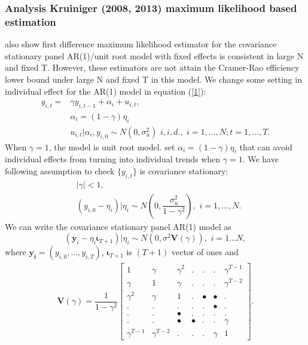 \documentclass[12pt,a4paper,hyperref]{article}
\begin{document}
\subsubsection{Analysis Kruiniger (2008, 2013) maximum likelihood based estimation }
\citet{Kruiniger:2008} also show first difference maximum likelihood estimator for the covariance stationary panel AR(1)/unit root model with fixed effects is consistent in large N and fixed T. However, these estimators are not attain the Cramer-Rao efficiency lower bound under large N and fixed T in this model. We change some setting in individual effect for the AR(1) model in equation (\ref{1}):
\begin{equation}
\begin{split}
y_{i,t}=&\gamma y_{i,t-1}+\alpha_{i}+u_{i,t}, \\
&\alpha_{i}=(1-\gamma)\eta_{i} \\
& u_{i,t} \vert \alpha_{i}, y_{i,0}\sim N(0,\sigma^{2}_{u}) \,\, i,i,d., \,\, i=1, \ldots, N; t=1,\ldots, T. \label{29}
\end{split}
\end{equation}
When $ \gamma=1 $, the model is unit root model. \citet{Kruiniger:2008} set $\alpha_{i}=(1-\gamma)\eta_{i}$ that can avoid individual effects from turning into individual trends when $\gamma=1$. 
We have following assumption to check $\lbrace y_{i,t}\rbrace$ is covariance stationary:
\begin{equation*}
\begin{split}
&\left\vert \gamma \right\vert < 1, \\
&\left( y_{i,0}-\eta_{i} \right)\vert \eta_{i}\sim N \left( 0,\dfrac{\sigma^{2}_{u}}{1-\gamma^{2}} \right), \,\, i=1, \ldots, N.
\end{split}
\end{equation*}
We can write the covariance stationary panel AR(1) model as
\begin{equation}
\left( \boldsymbol{y}_{i}-\eta_{i}\boldsymbol{\iota}_{T+1} \right)\vert \eta_{i} \sim N \left( 0, \sigma^{2}\boldsymbol{V}(\gamma) \right), \,\, i=1\ldots N,
\end{equation}
where $\boldsymbol{y_{i}}=\left( y_{i,0}, \ldots, y_{i,T} \right)$, $\boldsymbol{\iota}_{T+1}$ is $\left( T+1 \right)$ vector of ones and
\begin{align}
\boldsymbol{V} ( \gamma )=\dfrac{1}{1-\gamma^{2}}
\begin{bmatrix}
1 & \gamma & \gamma^{2} & . & . & . & \gamma^{T-1} \\
\gamma & 1 & \gamma & . & . & . & \gamma^{T-2} \\
\gamma^{2} & \gamma & 1 & . & • & • & . \\
. & . & . & . & . & • & . \\
. & . & • & . & . & . & . \\
. & . & • & • & . & . & \gamma \\
\gamma^{T-1} & \gamma^{T-2} & . & . & . & \gamma & 1
\end{bmatrix}.
\end{align}
\end{document}
